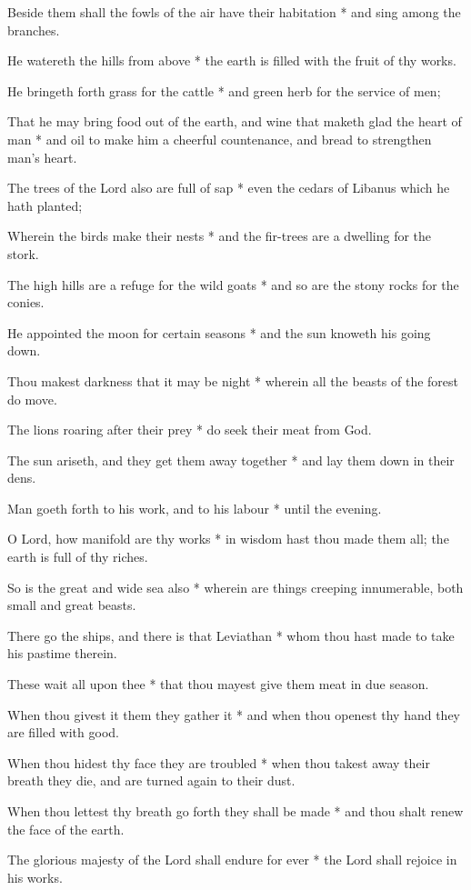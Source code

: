 Beside them shall the fowls of the air have their habitation * and sing among the branches.

He watereth the hills from above * the earth is filled with the fruit of thy works.

He bringeth forth grass for the cattle * and green herb for the service of men;

That he may bring food out of the earth, and wine that maketh glad the heart of man * and oil to make him a cheerful countenance, and bread to strengthen man's heart.

The trees of the Lord also are full of sap * even the cedars of Libanus which he hath planted;

Wherein the birds make their nests * and the fir-trees are a dwelling for the stork.

The high hills are a refuge for the wild goats * and so are the stony rocks for the conies.

He appointed the moon for certain seasons * and the sun knoweth his going down.

Thou makest darkness that it may be night * wherein all the beasts of the forest do move.

The lions roaring after their prey * do seek their meat from God.

The sun ariseth, and they get them away together * and lay them down in their dens.

Man goeth forth to his work, and to his labour * until the evening.

O Lord, how manifold are thy works * in wisdom hast thou made them all; the earth is full of thy riches.

So is the great and wide sea also * wherein are things creeping innumerable, both small and great beasts.

There go the ships, and there is that Leviathan * whom thou hast made to take his pastime therein.

These wait all upon thee * that thou mayest give them meat in due season.

When thou givest it them they gather it * and when thou openest thy hand they are filled with good.

When thou hidest thy face they are troubled * when thou takest away their breath they die, and are turned again to their dust.

When thou lettest thy breath go forth they shall be made * and thou shalt renew the face of the earth.

The glorious majesty of the Lord shall endure for ever * the Lord shall rejoice in his works.


